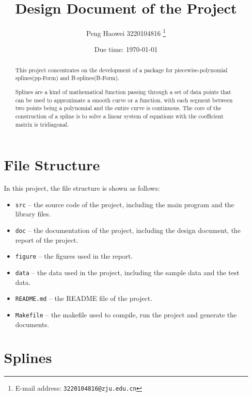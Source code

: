\documentclass[a4paper]{article}
\theoremstyle{definition}
\begin{document}
\title{\textbf{Design Document of the Project}}

\author{Peng Haowei 3220104816
  \thanks{E-mail address: \texttt{3220104816@zju.edu.cn}}}

\date{Due time: \today}

\maketitle

\begin{abstract}
  This project concentrates on the development of a package for piecewise-polynomial splines(pp-Form) and B-splines(B-Form). 

  Splines are a kind of mathematical function passing through a set of data points that can be used to approximate a smooth curve or a function, with each segment between two points being a polynomial and the entire curve is continuous. 
  The core of the construction of a spline is to solve a linear system of equations with the coefficient matrix is tridiagonal. 
  \end{abstract}

\section{File Structure}

In this project, the file structure is shown as follows:
\begin{itemize}
  \item \verb|src| -- the source code of the project, including the main program and the library files.
  \item \verb|doc| -- the documentation of the project, including the design document, the report of the project.
  \item \verb|figure| -- the figures used in the report.
  \item \verb|data| -- the data used in the project, including the sample data and the test data.
  \item \verb|README.md| -- the README file of the project.
  \item \verb|Makefile| -- the makefile used to compile, run the project and generate the documents.
\end{itemize}

\section{Splines}
\end{document}
